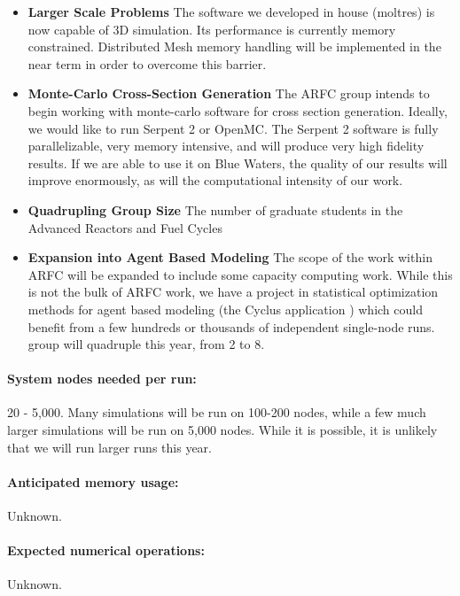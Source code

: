 \documentclass[letterpaper]{article}
\begin{document}
\begin{itemize}
        \item \textbf{Larger Scale Problems} The software we developed in house 
                (moltres) is now capable of 3D simulation. Its performance is 
                currently memory constrained.  Distributed Mesh memory handling 
                will be implemented in the near term in order to overcome this 
                barrier. 
        \item \textbf{Monte-Carlo Cross-Section Generation} The ARFC group intends to begin working with monte-carlo software for 
        cross section generation. Ideally, we would like to run Serpent 2 or 
                OpenMC. The Serpent 2 software is fully parallelizable, very 
                memory intensive, and will produce very high fidelity results. 
                If we are able to use it on Blue Waters, the quality of our 
                results will improve enormously, as will the computational 
                intensity of our work.
\item \textbf{Quadrupling Group Size} The number of graduate students in the Advanced Reactors and Fuel Cycles
        \item \textbf{Expansion into Agent Based Modeling} The scope of the 
                work within ARFC will be expanded to include some capacity 
                computing work. While this is not the bulk of ARFC work, we 
                have a project in statistical optimization methods for agent 
                based modeling (the Cyclus application 
                \cite{huff_fundamental_2016}) which could benefit 
                from a few hundreds or thousands of independent single-node 
                runs.  group will quadruple this year, from 2 to 8. 
\end{itemize}

\paragraph{System nodes needed per run:} 20 - 5,000. Many simulations will be 
run on 100-200 nodes, while a few much larger simulations will be run on 5,000 
nodes. While it is possible, it is unlikely that we will run larger runs 
this year.
\paragraph{Anticipated memory usage:} Unknown.
\paragraph{Expected numerical operations:} Unknown.
\end{document}
